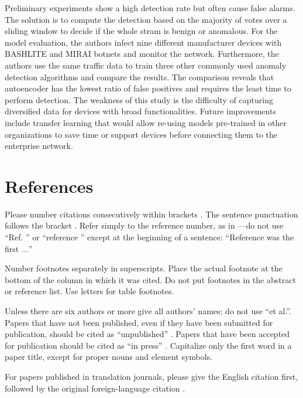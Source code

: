 \documentclass[conference, 11pt]{IEEEtran}
\begin{document}
Preliminary experiments show a high detection rate but often cause false alarms.
The solution is to compute the detection based on the majority of votes over a sliding window to decide if the whole stram is benign or anomalous.
For the model evaluation, the authors infect nine different manufacturer devices with BASHLITE and MIRAI botnets and monitor the network.
Furthermore, the authors use the same traffic data to train three other commonly used anomaly detection algorithms and compare the results.
The comparison reveals that autoencoder has the lowest ratio of false positives and requires the least time to perform detection.
The weakness of this study is the difficulty of capturing diversified data for devices with broad functionalities.
Future improvements include transfer learning that would allow re-using models pre-trained in other organizations to save time or support devices before connecting them to the enterprise network.
\section*{References}

Please number citations consecutively within brackets \cite{b1}. The 
sentence punctuation follows the bracket \cite{b2}. Refer simply to the reference 
number, as in \cite{b3}---do not use ``Ref. \cite{b3}'' or ``reference \cite{b3}'' except at 
the beginning of a sentence: ``Reference \cite{b3} was the first $\ldots$''

Number footnotes separately in superscripts. Place the actual footnote at 
the bottom of the column in which it was cited. Do not put footnotes in the 
abstract or reference list. Use letters for table footnotes.

Unless there are six authors or more give all authors' names; do not use 
``et al.''. Papers that have not been published, even if they have been 
submitted for publication, should be cited as ``unpublished'' \cite{b4}. Papers 
that have been accepted for publication should be cited as ``in press'' \cite{b5}. 
Capitalize only the first word in a paper title, except for proper nouns and 
element symbols.

For papers published in translation journals, please give the English 
citation first, followed by the original foreign-language citation \cite{b6}.
\end{document}
